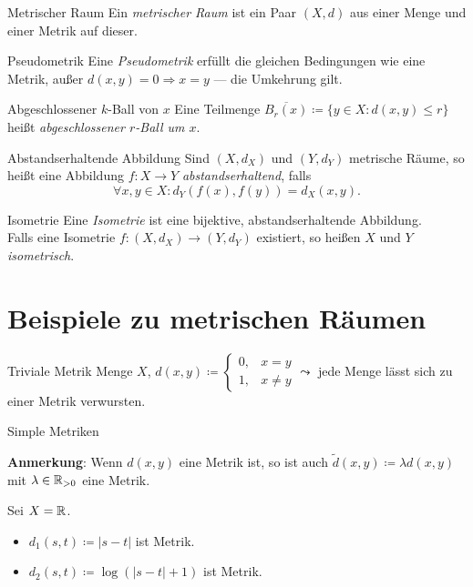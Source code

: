 \begin{definition}{Metrischer Raum}
  Ein \emph{metrischer Raum} ist ein Paar $ (X,d) $ aus einer Menge und einer Metrik auf dieser.
\end{definition}

\begin{definition}{Pseudometrik}
   Eine \emph{Pseudometrik} erfüllt die gleichen Bedingungen wie eine Metrik, außer $ d(x,y) = 0 \Rightarrow x = y $ --- die Umkehrung gilt.
\end{definition}

\begin{definition}{Abgeschlossener $ k $-Ball von $ x $}
  Eine Teilmenge $ \overline{B_r(x)} \coloneqq \{ y \in X : d(x,y) \leq r \} $ heißt \emph{abgeschlossener $ r $-Ball um $ x $}.
\end{definition}

\begin{definition}{Abstandserhaltende Abbildung}
  Sind $ (X, d_X) $ und $ (Y, d_Y) $ metrische Räume, so heißt eine Abbildung $ f: X \to Y $ \emph{abstandserhaltend}, falls
  \begin{equation*}
    \forall x, y \in X: d_Y(f(x), f(y)) = d_X(x, y)\text{.}
  \end{equation*}
\end{definition}

\begin{definition}{Isometrie}
  Eine \emph{Isometrie} ist eine bijektive, abstandserhaltende Abbildung. \\
  Falls eine Isometrie $ f: (X, d_X) \to (Y, d_Y) $ existiert, so heißen $ X $ und $ Y $ \emph{isometrisch}.
\end{definition}

\section{Beispiele zu metrischen Räumen}

\begin{example}{Triviale Metrik}
  Menge $ X $, $ d(x, y) \coloneqq \begin{cases}
    0, &x = y \\
    1, & x \neq y
  \end{cases} \leadsto $ jede Menge lässt sich zu einer Metrik verwursten. 
\end{example}

\begin{example}{Simple Metriken}
  \begin{marginfigure}
    \textbf{Anmerkung}: Wenn $ d(x, y) $ eine Metrik ist, so ist auch $ \widetilde{d}(x, y) \coloneqq \lambda d(x, y) $ mit $ \lambda \in \mathbb{R}_{>0} $ eine Metrik.
  \end{marginfigure}
  Sei $ X = \mathbb{R} $.
  \begin{itemize}
    \item $ d_1(s, t) \coloneqq |s-t| $ ist Metrik.
    \item $ d_2(s, t) \coloneqq \log(|s-t|+1) $ ist Metrik.
  \end{itemize}
\end{example}

